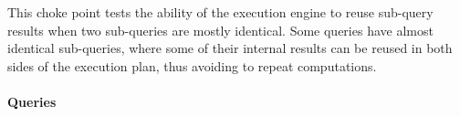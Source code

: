 
This choke point tests the ability of the execution engine to reuse sub-query
results when two sub-queries are mostly identical. Some queries have almost
identical sub-queries, where some of their internal results can be reused in
both sides of the execution plan, thus avoiding to repeat computations.


\paragraph{Queries}
{\raggedright
}